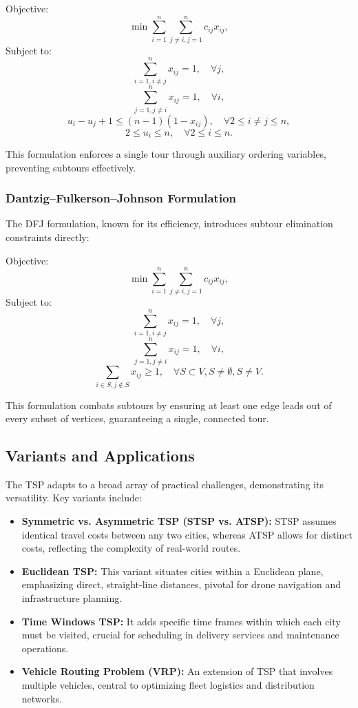 Objective:
\[
	\min \sum_{i=1}^{n} \sum_{j \ne i, j=1}^{n} c_{ij} x_{ij},
\]
Subject to:
\[
	\sum_{i=1, i \ne j}^{n} x_{ij} = 1, \quad \forall j,
\]
\[
	\sum_{j=1, j \ne i}^{n} x_{ij} = 1, \quad \forall i,
\]
\[
	u_i - u_j + 1 \le (n-1)(1 - x_{ij}), \quad \forall 2 \le i \ne j \le n,
\]
\[
	2 \le u_i \le n, \quad \forall 2 \le i \le n.
\]

This formulation enforces a single tour through auxiliary ordering variables, preventing subtours effectively.

\subsubsection{Dantzig–Fulkerson–Johnson Formulation}

The DFJ formulation, known for its efficiency, introduces subtour elimination constraints directly:

Objective:
\[
	\min \sum_{i=1}^{n} \sum_{j \ne i, j=1}^{n} c_{ij} x_{ij},
\]
Subject to:
\[
	\sum_{i=1, i \ne j}^{n} x_{ij} = 1, \quad \forall j,
\]
\[
	\sum_{j=1, j \ne i}^{n} x_{ij} = 1, \quad \forall i,
\]
\[
	\sum_{i \in S, j \notin S} x_{ij} \ge 1, \quad \forall S \subset V, S \ne \emptyset, S \ne V.
\]

This formulation combats subtours by ensuring at least one edge leads out of every subset of vertices, guaranteeing a single, connected tour.

\subsection{Variants and Applications}

The TSP adapts to a broad array of practical challenges, demonstrating its versatility. Key variants include:

\begin{itemize}
	\item \textbf{Symmetric vs. Asymmetric TSP (STSP vs. ATSP):} STSP assumes identical travel costs between any two cities, whereas ATSP allows for distinct costs, reflecting the complexity of real-world routes.
	\item \textbf{Euclidean TSP:} This variant situates cities within a Euclidean plane, emphasizing direct, straight-line distances, pivotal for drone navigation and infrastructure planning.
	\item \textbf{Time Windows TSP:} It adds specific time frames within which each city must be visited, crucial for scheduling in delivery services and maintenance operations.
	\item \textbf{Vehicle Routing Problem (VRP):} An extension of TSP that involves multiple vehicles, central to optimizing fleet logistics and distribution networks.
\end{itemize}

